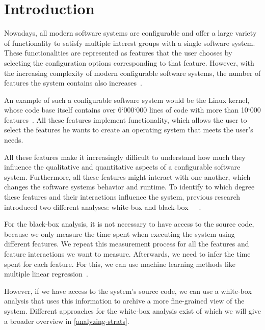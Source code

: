 \chapter{Introduction}\label{ch:introduction}

Nowadays, all modern software systems are configurable and offer a large variety of functionality to satisfy multiple 
interest groups with a single software system. These functionalities are represented as features that the user chooses by selecting the 
configuration options corresponding to that feature. However, with the increasing complexity of modern configurable software systems, 
the number of features the system contains also increases~\cite{Feature-Oriented-Software-Product-Lines}.

An example of such a configurable software system would be the Linux kernel, whose
code base itself contains over 6‘000‘000 lines of code with more than 10‘000 features~\cite{Linux-Kernel}.
All these features implement functionality, which allows the user to select the features he
wants to create an operating system that meets the user’s needs.

All these features make it increasingly difficult to understand how much they influence the qualitative and quantitative
aspects of a configurable software system. 
Furthermore, all these features might interact with one another, which changes the software systems behavior and runtime. 
To identify to which degree these features and their interactions influence the system, previous research introduced two different analyses: 
white-box and black-box~\cite{Comprex}~\cite{ConfigCrusher}~\cite{Linear-Regression-Performance}.

For the black-box analysis, 
it is not necessary to have access to the source code, because we only measure the time spent when executing the system using different features. 
We repeat this measurement process for all the features and feature interactions we want to measure. 
Afterwards, we need to infer the time spent for each feature. For this, we can use machine learning methods like multiple linear regression~\cite{Linear-Regression-Performance}. 

However, if we have access to the system's source code, we can use a white-box analysis that uses this information to archive a more fine-grained 
view of the system. Different approaches for the white-box analysis exist of which we will give a broader overview in \autoref{analyzing-strats}.

